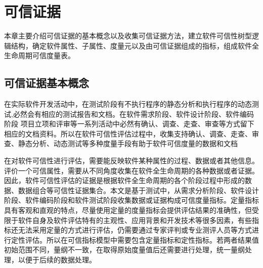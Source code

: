 \chapter{可信证据}
\label{ch3}
\vspace{-0.7cm}

\begin{kaishu}
本章主要介绍可信证据的基本概念以及收集可信证据方法，建立软件可信性树型逻辑结构，确定软件属性、子属性、度量元以及由可信证据组成的指标，组成软件全生命周期可信度量表。
\end{kaishu}

\section{可信证据基本概念 }

在实际软件开发活动中，在测试阶段有不执行程序的静态分析和执行程序的动态测试,必然会有相应的测试报告和文档。在软件需求阶段、软件设计阶段、软件编码阶段
项目立项和评审等一系列活动中必然有确认、调查、走查、审查等方式留下相应的文档资料。所以在软件可信性评估过程中，收集支持确认、调查、走查、审查、静态分析、动态测试等多种度量手段有助于软件可信度量的数据和文档

在对软件可信性进行评估，需要能反映软件某种属性的过程、数据或者其他信息。评价一个可信属性，需要从不同角度收集在软件全生命周期的各种数据或者证据。因此，软件可信性评估的证据是根据软件全生命周期的各个阶段过程中形成的数据、数据组合等可信性证据集合。本文是基于测试中，从需求分析阶段、软件设计阶段、软件编码阶段和软件测试阶段收集数据或证据构成可信度量指标。定量指标具有客观和直观的特点，尽量使用定量的度量指标会提供评估结果的准确性，但受限于软件自身及软件评估特有的主观性、应用背景和开发技术等很多因素，有些指标还无法采用定量的方式进行评估，仍需要通过专家评判或专业测评人员等方式进行定性评估。所以在可信指标模型中需要包含定量指标和定性指标。若两者结果值初始范围不同，量纲不一致，在取得原始度量值后还需要进行处理，统一量纲处理，以便于后续的数据处理。

